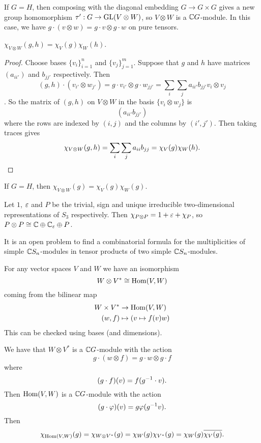 \begin{cor}
  If $G=H$, then composing with the diagonal embedding $G \to G \times G$ gives a new group homomorphism $\tau': G \to \operatorname{GL}(V \otimes W)$, so $V \otimes W$ is a $\mathbb{C} G$-module.
  In this case, we have $g \cdot (v \otimes w) = g \cdot v \otimes g \cdot w$ on pure tensors.
\end{cor}

\begin{prop}
  $\chi_{V \otimes W}(g,h) = \chi_V(g)\chi_W(h)$.
\end{prop}

\begin{proof}
  Choose bases $\{v_i\}_{i=1}^n$ and $\{v_j\}_{j=1}^m$.
  Suppose that $g$ and $h$ have matrices $(a_{ii'})$ and $b_{jj'}$ respectively.
  Then
  \[(g,h)\cdot(v_{i'} \otimes w_{j'}) = g \cdot v_{i'} \otimes g \cdot w_{jj'} = \sum_i \sum_j a_{ii'}b_{jj'} v_i \otimes v_j\].
  So the matrix of $(g,h)$ on $V \otimes W$ in the basis $\{v_i \otimes w_j\}$ is
  \[(a_{ii'}b_{jj'})\]
  where the rows are indexed by $(i,j)$ and the columns by $(i',j')$.
  Then taking traces gives
  \[\chi_{V \otimes W}(g,h) = \sum_i \sum_j a_{ii} b_{jj} = \chi_V(g)\chi_W(h). \qedhere\]
\end{proof}

\begin{cor}
  If $G=H$, then $\chi_{V \otimes W}(g) = \chi_V(g)\chi_W(g)$.
\end{cor}

\begin{exam}
  Let $1$, $\varepsilon$ and $P$ be the trivial, sign and unique irreducible two-dimensional representations of $S_3$ respectively.
  Then $\chi_{P \otimes P} = 1+\varepsilon+\chi_P$, so $P \otimes P \cong \mathbb{C} \oplus \mathbb{C}_\varepsilon \oplus P$.
\end{exam}

\begin{rmk}
  It is an open problem to find a combinatorial formula for the multiplicities of simple $\mathbb{C} S_n$-modules in tensor products of two simple $\mathbb{C} S_n$-modules.
\end{rmk}

\begin{prop}
  For any vector spaces $V$ and $W$ we have an isomorphism
  \[W \otimes V^* \cong \operatorname{Hom}(V,W)\]
  coming from the bilinear map
  \begin{align*}
    W \times V^* &\to \operatorname{Hom}(V,W) \\
    (w,f) &\mapsto (v \mapsto f(v)w)
  \end{align*}
  This can be checked using bases (and dimensions).
\end{prop}

\begin{cor}
  We have that $W \otimes V^*$ is a $\mathbb{C} G$-module with the action
  \[g \cdot (w \otimes f) = g \cdot w \otimes g \cdot f\]
  where
  \[(g \cdot f)(v) = f(g^{-1} \cdot v).\]
  Then $\operatorname{Hom}(V,W)$ is a $\mathbb{C} G$-module with the action
  \[(g \cdot \varphi)(v) = g\varphi(g^{-1} v).\]
  Then
  \[\chi_{\operatorname{Hom}(V,W)}(g) = \chi_{W \otimes V^*}(g) = \chi_W(g)\chi_{V^*}(g) = \chi_W(g)\overline{\chi_V(g)}.\]
\end{cor}
